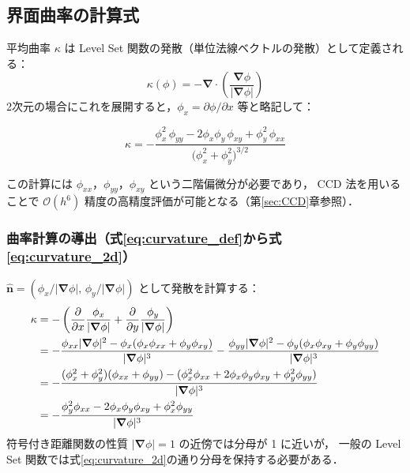 \documentclass[12pt, a4paper, titlepage]{article}
\newcommand{\jp}[1]{{\normalfont\jpfont #1}}
\newcommand{\pd}[2]{\dfrac{\partial #1}{\partial #2}}
\newcommand{\bnabla}{\bm{\nabla}}
\newcommand{\Ord}[1]{\mathcal{O}(#1)}
\begin{document}
\subsection{\jp{界面曲率の計算式}}

\jp{平均曲率 $\kappa$ は Level Set 関数の発散（単位法線ベクトルの発散）として定義される：}
\begin{equation}
  \kappa(\phi) = -\bnabla\cdot\!\left(\frac{\bnabla\phi}{|\bnabla\phi|}\right)
  \label{eq:curvature_def}
\end{equation}
\jp{2次元の場合にこれを展開すると，$\phi_x = \partial\phi/\partial x$ 等と略記して：}
\begin{tcolorbox}[mybox, title={\jp{2次元界面曲率（展開形）}}]
\begin{equation}
  \kappa = -\frac{
    \phi_x^2\,\phi_{yy}
    - 2\phi_x\phi_y\,\phi_{xy}
    + \phi_y^2\,\phi_{xx}
  }{\bigl(\phi_x^2 + \phi_y^2\bigr)^{3/2}}
  \label{eq:curvature_2d}
\end{equation}
\end{tcolorbox}
\jp{この計算には $\phi_{xx}$，$\phi_{yy}$，$\phi_{xy}$ という二階偏微分が必要であり，
CCD 法を用いることで $\Ord{h^6}$ 精度の高精度評価が可能となる（第\ref{sec:CCD}章参照）．}

\subsubsection{\jp{曲率計算の導出（式\eqref{eq:curvature_def}から式\eqref{eq:curvature_2d}）}}

\jp{$\hat{\bm{n}} = (\phi_x/|\bnabla\phi|,\, \phi_y/|\bnabla\phi|)$ として発散を計算する：}
\begin{align}
  \kappa
  &= -\left(\pd{}{x}\frac{\phi_x}{|\bnabla\phi|}
           + \pd{}{y}\frac{\phi_y}{|\bnabla\phi|}\right) \notag\\
  &= -\frac{\phi_{xx}|\bnabla\phi|^2 - \phi_x(\phi_x\phi_{xx}+\phi_y\phi_{xy})}{|\bnabla\phi|^3}
     -\frac{\phi_{yy}|\bnabla\phi|^2 - \phi_y(\phi_x\phi_{xy}+\phi_y\phi_{yy})}{|\bnabla\phi|^3}
     \notag\\
  &= -\frac{(\phi_x^2+\phi_y^2)(\phi_{xx}+\phi_{yy})
            - (\phi_x^2\phi_{xx}+2\phi_x\phi_y\phi_{xy}+\phi_y^2\phi_{yy})}{|\bnabla\phi|^3}
     \notag\\
  &= -\frac{\phi_y^2\phi_{xx} - 2\phi_x\phi_y\phi_{xy} + \phi_x^2\phi_{yy}}{|\bnabla\phi|^3}
\end{align}
\jp{符号付き距離関数の性質 $|\bnabla\phi|=1$ の近傍では分母が 1 に近いが，
一般の Level Set 関数では式\eqref{eq:curvature_2d}の通り分母を保持する必要がある．}
\end{document}
